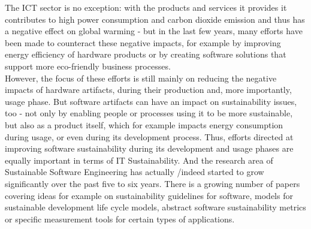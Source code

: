 The ICT sector is no exception: with the products and services it provides it contributes to high power consumption and carbon dioxide emission %
 and thus has a negative effect on global warming \cite{smart2020} %
- but in the last few years, many efforts have been made to counteract these negative impacts, for example by improving energy efficiency of hardware products or by creating software solutions that support more eco-friendly business processes.\\
However, the focus of these efforts is still mainly on reducing the negative impacts of hardware artifacts, %
 during their production and, more importantly, usage phase. But software artifacts can have an impact on sustainability issues, too - not only by enabling people or processes using it to be more sustainable, but also as a product itself, which for example impacts energy consumption during usage, or even during its development process. %
Thus, efforts directed at improving software sustainability during its development and usage phases are equally important in terms of IT Sustainability. And the research area of Sustainable Software Engineering has actually /indeed %
 started to grow %
significantly over the past five to six years. %
There is a growing number of papers %
covering ideas for example on sustainability guidelines for software, models for sustainable development life cycle models, abstract software sustainability metrics or specific measurement tools for certain types of applications. %

